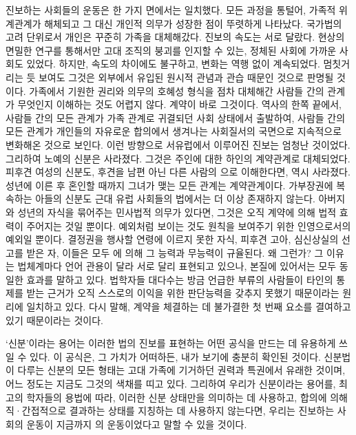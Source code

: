 진보하는 사회들의 운동은 한 가지 면에서는 일치했다.
모든 과정을 통털어, 가족적 위계관계가 해체되고 그 대신 개인적 의무가
성장한 점이 뚜렷하게 나타났다.
국가법의 고려 단위로서
개인은 꾸준히 가족을 대체해갔다.
진보의 속도는 서로 달랐다.
현상의 면밀한 연구를 통해서만
고대 조직의 붕괴를 인지할 수 있는,
정체된 사회에 가까운 사회도 있었다.
하지만,
속도의 차이에도 불구하고,
변화는 역행 없이 계속되었다.
멈칫거리는 듯 보여도 그것은 외부에서 유입된 원시적 관념과 관습 때문인 것으로
판명될 것이다.
가족에서 기원한 권리와 의무의 호혜성 형식을 점차 대체해간
사람들 간의 관계가 무엇인지 이해하는 것도 어렵지 않다.
계약이 바로 그것이다.
역사의 한쪽 끝에서,
사람들 간의 모든 관계가 가족 관계로 귀결되던 사회 상태에서 출발하여,
사람들 간의 모든 관계가 개인들의 자유로운 합의에서 생겨나는
사회질서의 국면으로
지속적으로 변화해온 것으로 보인다.
이런 방향으로
서유럽에서
이루어진 진보는 엄청난 것이었다.
그리하여 노예의 신분은 사라졌다.
그것은 주인에 대한 하인의 계약관계로 대체되었다.
피후견 여성의 신분도,
후견을 남편 아닌 다른 사람의 으로 이해한다면,
역시 사라졌다.
성년에 이른 후 혼인할 때까지 그녀가 맺는 모든 관계는 계약관계이다.
가부장권에 복속하는 아들의 신분도 근대 유럽 사회들의 법에서는
더 이상 존재하지 않는다.
아버지와 성년의 자식을 묶어주는 민사법적 의무가 있다면,
그것은 오직 계약에 의해 법적 효력이 주어지는 것일 뿐이다.
예외처럼 보이는 것도 원칙을 보여주기 위한
인영으로서의 예외일 뿐이다.
결정권을 행사할 연령에 이르지 못한 자식,
피후견 고아, 심신상실의 선고를 받은 자,
이들은 모두 에 의해
그 능력과 무능력이 규율된다.
왜 그런가?
그 이유는 법체계마다 언어 관용이 달라 서로 달리 표현되고 있으나,
본질에 있어서는 모두 동일한 효과를 말하고 있다.
법학자들 대다수는
방금 언급한 부류의 사람들이
타인의 통제를 받는 근거가
오직
스스로의 이익을 위한 판단능력을 갖추지 못했기 때문이라는 원리에
일치하고 있다.
다시 말해, 계약을 체결하는 데 불가결한
첫 번째 요소를 결여하고 있기 때문이라는 것이다.

`신분'이라는 용어는
이러한 법의 진보를 표현하는 어떤 공식을 만드는 데
유용하게 쓰일 수 있다.
이 공식은, 그 가치가 어떠하든,
내가 보기에 충분히 확인된 것이다.
신분법이 다루는 신분의 모든 형태는
고대 가족에 기거하던 권력과 특권에서 유래한 것이며,
어느 정도는 지금도 그것의 색채를 띠고 있다.
그리하여 우리가 신분이라는 용어를,
최고의 학자들의 용법에 따라,
이러한 신분 상태만을 의미하는 데 사용하고,
합의에 의해 직^^b7간접적으로 결과하는 상태를
지칭하는 데 사용하지 않는다면,
우리는 진보하는 사회의 운동이 지금까지
의 운동이었다고
말할 수 있을 것이다.

